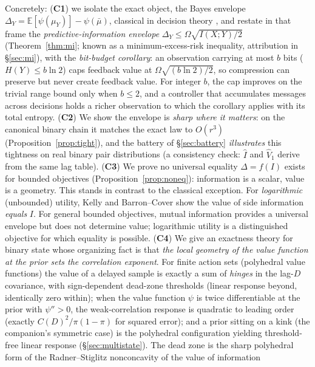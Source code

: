 \documentclass[11pt]{article}
\newcommand{\E}{\mathbb{E}}
\begin{document}
Concretely: (\textbf{C1}) we isolate the exact object, the Bayes envelope
$\Delta_Y=\E[\psi(\mu_Y)]-\psi(\bar\mu)$, classical in decision theory
\cite{howard1966,raiffa61,delaragossner}, and restate in that frame the
\emph{predictive-information envelope}
$\Delta_Y\le\Omega\sqrt{I(X;Y)/2}$ (Theorem~\ref{thm:mi}; known as a
minimum-excess-risk inequality, attribution in \S\ref{sec:mi}), with the
\emph{bit-budget corollary}: an observation carrying at most $b$ bits
($H(Y)\le b\ln 2$) caps feedback value at $\Omega\sqrt{(b\ln2)/2}$, so
compression can preserve but never create feedback value. For integer $b$, the cap
improves on the trivial range bound only when $b\le2$, and a controller that accumulates messages across decisions
holds a richer observation to which the corollary applies with its total
entropy. (\textbf{C2}) We show the envelope is \emph{sharp
where it matters}: on the canonical binary chain it matches the exact law to
$O(r^3)$ (Proposition~\ref{prop:tight}), and the battery of
\S\ref{sec:battery} \emph{illustrates} this tightness on real binary
pair distributions (a
consistency check: $\hat I$ and $\widehat V_1$ derive
from the same lag table). (\textbf{C3}) We prove no universal
equality $\Delta=f(I)$ exists for bounded objectives
(Proposition~\ref{prop:noneq}): information is a scalar, value is a
geometry. This stands in contrast to the classical exception. For
\emph{logarithmic} (unbounded) utility, Kelly and Barron--Cover
\cite{kelly56,barroncover88} show the value of side information \emph{equals}
$I$. For general bounded objectives, mutual information provides a
universal envelope but does not determine value; logarithmic utility is a
distinguished objective for which equality is possible.
(\textbf{C4}) We give an exactness theory for binary state whose organizing
fact is that \emph{the local geometry of the value function at the prior
sets the correlation exponent}. For finite action sets (polyhedral value
functions) the value of a delayed sample is exactly a sum of
\emph{hinges} in the lag-$D$ covariance, with sign-dependent dead-zone
thresholds (linear response beyond, identically zero within); when the
value function $\psi$ is twice differentiable at the prior with
$\psi''>0$, the weak-correlation response is quadratic to leading order
(exactly $C(D)^2/\pi(1-\pi)$ for squared error); and a prior sitting on
a kink (the companion's symmetric case) is the polyhedral
configuration yielding threshold-free linear response
(\S\ref{sec:multistate}). The dead zone is the sharp polyhedral form of the
Radner--Stiglitz nonconcavity of the value of information
\end{document}
